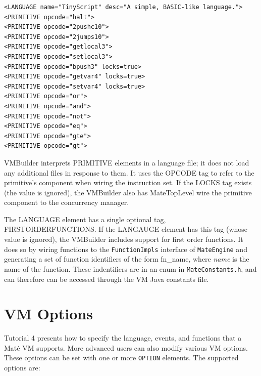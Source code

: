 \documentclass[12pt]{article}
\newcommand{\mate}{Mat\'{e}\xspace}
\begin{document}
{\scriptsize
\begin{verbatim}
<LANGUAGE name="TinyScript" desc="A simple, BASIC-like language.">
<PRIMITIVE opcode="halt">
<PRIMITIVE opcode="2pushc10">
<PRIMITIVE opcode="2jumps10">
<PRIMITIVE opcode="getlocal3">
<PRIMITIVE opcode="setlocal3">
<PRIMITIVE opcode="bpush3" locks=true>
<PRIMITIVE opcode="getvar4" locks=true>
<PRIMITIVE opcode="setvar4" locks=true>
<PRIMITIVE opcode="or">
<PRIMITIVE opcode="and">
<PRIMITIVE opcode="not">
<PRIMITIVE opcode="eq">
<PRIMITIVE opcode="gte">
<PRIMITIVE opcode="gt">
\end{verbatim}
}

VMBuilder interprets PRIMITIVE elements in a language file; it does
not load any additional files in response to them. It uses the OPCODE
tag to refer to the primitive's component when wiring the instruction
set. If the LOCKS tag exists (the value is ignored), the VMBuilder
also has MateTopLevel wire the primitive component to the concurrency
manager.

The LANGUAGE element has a single optional tag,
FIRSTORDERFUNCTIONS. If the LANGAUGE element has this tag (whose value
is ignored), the VMBuilder includes support for first order
functions. It does so by wiring functions to the {\tt FunctionImpls}
interface of {\tt MateEngine} and generating a set of function
identifiers of the form fn\_name, where {\it name} is the name of the
function. These indentifiers are in an enum in {\tt MateConstants.h},
and can therefore can be accessed through the VM Java constants file.

\section{VM Options}

Tutorial 4 presents how to specify the language, events, and functions
that a \mate VM supports. More advanced users can also modify various
VM options. These options can be set with one or more {\tt OPTION}
elements. The supported options are:
\end{document}
